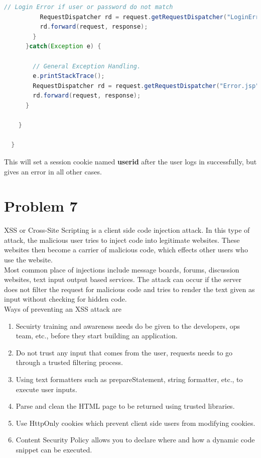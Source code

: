 \documentclass{article}
\begin{document}
\begin{lstlisting}[language=java]
          // Login Error if user or password do not match 
          RequestDispatcher rd = request.getRequestDispatcher("LoginError.jsp");
          rd.forward(request, response);
        }
      }catch(Exception e) {

        // General Exception Handling.
        e.printStackTrace();
        RequestDispatcher rd = request.getRequestDispatcher("Error.jsp");
        rd.forward(request, response);
      }
  
    }
  
  }
\end{lstlisting}

This will set a session cookie named \textbf{userid} after the user logs in successfully, but gives an error
in all other cases.

\section{Problem 7}
XSS or Cross-Site Scripting is a client side code injection attack. In this
type of attack, the malicious user tries to inject code into legitimate websites.
These websites then become a carrier of malicious code, which effects other users
who use the website. \\

Most common place of injections include message boards, forums, discussion websites, text input output based services.
The attack can occur if the server does not filter the request for malicious code and tries to render the text 
given as input without checking for hidden code. \\

Ways of preventing an XSS attack are
\begin{enumerate}
  \item Secuirty training and awareness needs do be given to the developers, ops team, etc., before they start building an application.
  \item Do not trust any input that comes from the user, requests needs to go through a trusted filtering process.
  \item Using text formatters such as prepareStatement, string formatter, etc., to execute user inputs.
  \item Parse and clean the HTML page to be returned using trusted libraries.
  \item Use HttpOnly cookies which prevent client side users from modifying cookies.
  \item Content Security Policy allows you to declare where and how a dynamic code snippet can be executed.
\end{enumerate}
\end{document}
